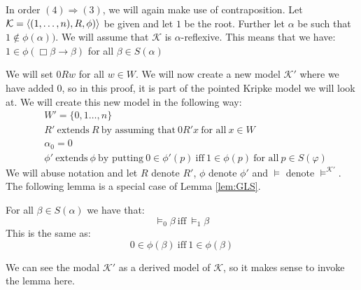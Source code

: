 \documentclass[../main.tex]{subfiles}
\begin{document}
In order $(4)\Rightarrow(3)$, we will again make use of contraposition. Let
$\mathcal{K}=\langle(1,\ldots,n),R,\phi)\rangle$ be given and let $1$ be the root.
Further let $\alpha$ be such that $1\not\in\phi(\alpha))$.
We
will assume that $\mathcal{K}$ is $\alpha$-reflexive. This means that we have:
$1\in\phi(\Box\beta\rightarrow\beta)$ for all $\beta\in S(\alpha)$

We will set $0Rw$ for all $w\in W$. We will now create a new model
$\mathcal{K'}$ where we have added $0$, so in this proof, it is part of the
pointed Kripke model we will look at. We will create this new model in the
following way:
\begin{align*}
	&W'=\{0,1\ldots,n\}\\
	&R'\ \text{extends}\ R\ \text{by assuming that}\ 0R'x\ \text{for all}\
	x\in W\\
	&\alpha_0=0\\
	&\phi'\ \text{extends}\ \phi\ \text{by putting}\ 0\in\phi'(p)\
	\text{iff}\ 1\in\phi(p)\ \text{for all}\ p\in S(\varphi)
\end{align*}
We will abuse notation and let $R$ denote $R'$, $\phi$ denote $\phi'$ and
$\vDash$ denote $\vDash^{\mathcal{K'}}$.
The following lemma is a special case of Lemma \ref{lem:GLS}.
\begin{lem}
	For all $\beta\in S(\alpha)$ we have that:
	\[\vDash_0\beta\ \text{iff}\ \vDash_1\beta \]
	This is the same as:
	\[0\in\phi(\beta)\ \text{iff}\ 1\in\phi(\beta)\]
\end{lem}
We can see the modal $\mathcal{K}'$ as a derived model of $\mathcal{K}$, so it
makes sense to invoke the lemma here.
\end{document}
